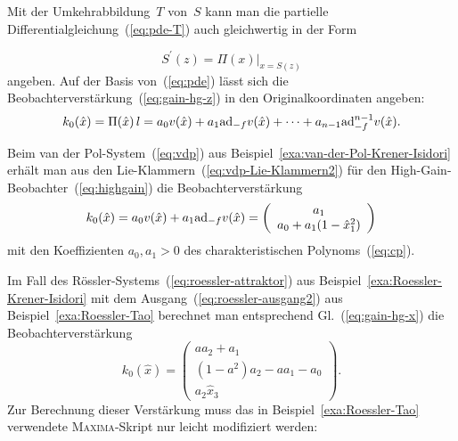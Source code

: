 Mit der Umkehrabbildung~$T$ von~$S$ kann man die partielle Differentialgleichung~(\ref{eq:pde-T})
auch gleichwertig in der Form 

\begin{equation}
S^{\prime}(z)=\left.\Pi(x)\right|_{x=S(z)}\label{eq:pde}
\end{equation}
angeben. Auf der Basis von~(\ref{eq:pde}) lässt sich die Beobachterverstärkung~(\ref{eq:gain-hg-z})
in den Originalkoordinaten angeben:
\begin{equation}
k_{0}(\hat{x})=\Pi(\hat{x})\,l=a_{0}v(\hat{x})+a_{1}{\operatorname{ad}}_{-f}v(\hat{x})+\cdots+a_{n-1}{\operatorname{ad}}_{-f}^{n-1}v(\hat{x}).\label{eq:gain-hg-x}
\end{equation}

\begin{example}
\label{exa:vdp-NF-high-gain}Beim van der Pol-System~(\ref{eq:vdp})
aus Beispiel~\ref{exa:van-der-Pol-Krener-Isidori} erhält man aus
den Lie-Klammern~(\ref{eq:vdp-Lie-Klammern2}) für den High-Gain-Beobachter~(\ref{eq:highgain})
die Beobachterverstärkung 
\begin{equation}
k_{0}(\hat{x})=a_{0}v(\hat{x})+a_{1}{\operatorname{ad}}_{-f}v(\hat{x})=\left(\begin{array}{c}
a_{1}\\
a_{0}+a_{1}(1-\hat{x}_{1}^{2})
\end{array}\right)\label{eq:vdp-k0}
\end{equation}
mit den Koeffizienten $a_{0},a_{1}>0$ des charakteristischen Polynoms~(\ref{eq:cp}).
\end{example}

\begin{example}
\label{exa:roessler-NF-high-gain}Im Fall des Rössler-Systems~(\ref{eq:roessler-attraktor})
aus Beispiel~\ref{exa:Roessler-Krener-Isidori} mit dem Ausgang~(\ref{eq:roessler-ausgang2})
aus Beispiel~\ref{exa:Roessler-Tao} berechnet man entsprechend Gl.~(\ref{eq:gain-hg-x})
die Beobachterverstärkung 
\begin{equation}
k_{0}(\hat{x})=\left(\begin{array}{c}
aa_{2}+a_{1}\\
(1-a^{2})a_{2}-aa_{1}-a_{0}\\
a_{2}\hat{x}_{3}
\end{array}\right).\label{eq:roessler-k0}
\end{equation}
Zur Berechnung dieser Verstärkung muss das in Beispiel~\ref{exa:Roessler-Tao}
verwendete \textsc{Maxima}-Skript nur leicht modifiziert werden:

\begin{maxima}\end{maxima}
\end{example}

